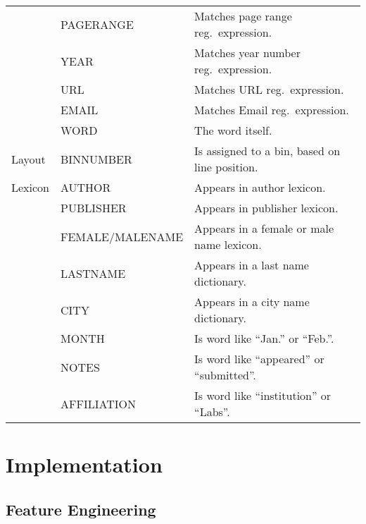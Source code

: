 {\begin{minipage}[c]{\linewidth}
\begin{tabular}{l l l}
          & PAGERANGE        & Matches page range reg.\ expression.\\
          & YEAR             & Matches year number reg.\ expression.\\
          & URL              & Matches URL reg.\ expression.\\
          & EMAIL            & Matches Email reg.\ expression.\\
          & WORD             & The word itself.\\
  \midrule
  Layout  & BINNUMBER        & Is assigned to a bin, based on line position.\\
  \midrule
  Lexicon & AUTHOR           & Appears in author lexicon.\\
          & PUBLISHER        & Appears in publisher lexicon.\\
          & FEMALE/MALENAME  & Appears in a female or male name lexicon.\\
          & LASTNAME         & Appears in a last name dictionary.\\
          & CITY             & Appears in a city name dictionary.\\
          & MONTH            & Is word like ``Jan.'' or ``Feb.''.\\
          & NOTES            & Is word like ``appeared'' or ``submitted''.\\
          & AFFILIATION      & Is word like ``institution'' or ``Labs''.\\
  \bottomrule
\end{tabular}
\label{tab:feature-descriptions}
\end{minipage}
}

\chapter{Implementation}\label{app:cha-implementation}
\section{Feature Engineering}\label{app:sec-feature-engineering}

